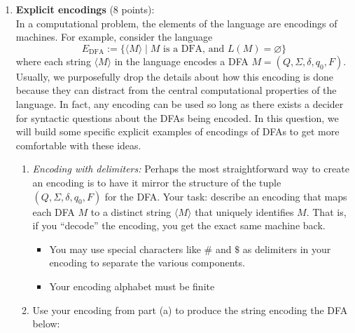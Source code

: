 \begin{enumerate} 
\item \textbf{Explicit encodings} (8 points): \\
In a computational problem, the elements of the language are encodings of machines. For example, 
consider the language 
\[
E_{\mathrm{DFA}} := \{ \langle M \rangle \mid M \text{ is a DFA, and } L(M) = \varnothing \}
\]
where each string $\langle M \rangle$ in the language encodes a DFA $M = (Q, \Sigma, \delta, q_0, F)$.
Usually, we purposefully drop the details about how this encoding is done because they can distract from 
the central computational 
properties of the language. In fact, any encoding can be used so long as there exists a decider for 
syntactic questions about the DFAs being encoded. 
In this question, we will build some specific 
explicit examples of encodings of DFAs to get more comfortable with these ideas.

\begin{enumerate}
\item\gradeCompleteFirst \textit{Encoding with delimiters:} Perhaps the most straightforward
way to create an encoding is to have it mirror the structure of the tuple $(Q, \Sigma, \delta, q_0, F)$ 
for the DFA. Your task: describe an encoding that maps each DFA $M$ to a distinct string $\langle M \rangle$ 
that uniquely identifies $M$. That is, if you ``decode'' the encoding, you get the exact same machine back. 

\begin{itemize}[itemsep=-10pt]
\item You may use special characters like $\#$ and $\$$ as delimiters in your encoding to separate the 
various components. \\
\item Your encoding alphabet must be finite
\end{itemize}
\item\gradeComplete Use your encoding from part (a) to produce
the string encoding the DFA below:
\begin{center}
\end{center}


\end{enumerate}
\end{enumerate}

